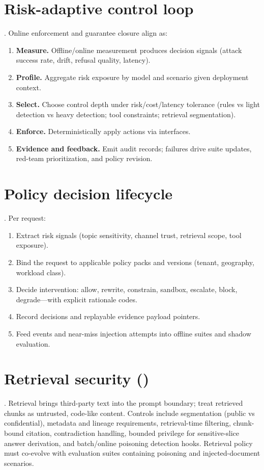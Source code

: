 \documentclass[11pt,a4paper]{report}
\begin{document}
\section{Risk-adaptive control loop}
\ControlPlane{}. Online enforcement and guarantee closure align as:
\begin{enumerate}
  \item \textbf{Measure.} Offline/online measurement produces decision signals (attack success rate, drift, refusal quality, latency).
  \item \textbf{Profile.} Aggregate risk exposure by model and scenario given deployment context.
  \item \textbf{Select.} Choose control depth under risk/cost/latency tolerance (rules vs light detection vs heavy detection; tool constraints; retrieval segmentation).
  \item \textbf{Enforce.} Deterministically apply actions via \SafetyKernel{} interfaces.
  \item \textbf{Evidence and feedback.} Emit audit records; failures drive suite updates, red-team prioritization, and policy revision.
\end{enumerate}

\section{Policy decision lifecycle}
\DecoupledSafety{}. Per request:
\begin{enumerate}
  \item Extract risk signals (topic sensitivity, channel trust, retrieval scope, tool exposure).
  \item Bind the request to applicable policy packs and versions (tenant, geography, workload class).
  \item Decide intervention: allow, rewrite, constrain, sandbox, escalate, block, degrade—with explicit rationale codes.
  \item Record decisions and replayable evidence payload pointers.
  \item Feed events and near-miss injection attempts into offline suites and shadow evaluation.
\end{enumerate}

\section{Retrieval security (\RAG{})}
\ControlPlane{}. Retrieval brings third-party text into the prompt boundary; treat retrieved chunks as untrusted, code-like content. Controls include segmentation (public vs confidential), metadata and lineage requirements, retrieval-time filtering, chunk-bound citation, contradiction handling, bounded privilege for sensitive-slice answer derivation, and batch/online poisoning detection hooks. Retrieval policy must co-evolve with evaluation suites containing poisoning and injected-document scenarios.
\end{document}
